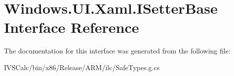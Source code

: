 \hypertarget{interface_windows_1_1_u_i_1_1_xaml_1_1_i_setter_base}{}\section{Windows.\+U\+I.\+Xaml.\+I\+Setter\+Base Interface Reference}
\label{interface_windows_1_1_u_i_1_1_xaml_1_1_i_setter_base}


The documentation for this interface was generated from the following file\+:\begin{DoxyCompactItemize}
\item 
I\+V\+S\+Calc/bin/x86/\+Release/\+A\+R\+M/ilc/Safe\+Types.\+g.\+cs\end{DoxyCompactItemize}
